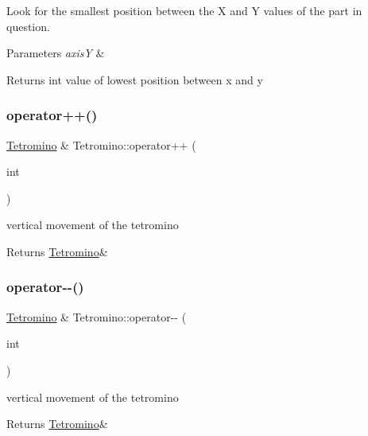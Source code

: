 Look for the smallest position between the X and Y values of the part in question. 


\begin{DoxyParams}{Parameters}
{\em axisY} & \\
\hline
\end{DoxyParams}
\begin{DoxyReturn}{Returns}
int value of lowest position between x and y 
\end{DoxyReturn}
\mbox{\label{classTetromino_ab4dd61078d1383df779f5f615d352a17}} 
\subsubsection{\texorpdfstring{operator++()}{operator++()}}
{\footnotesize\ttfamily \hyperlink{classTetromino}{Tetromino} \& Tetromino\+::operator++ (\begin{DoxyParamCaption}\item[{int}]{ }\end{DoxyParamCaption})}



vertical movement of the tetromino 

\begin{DoxyReturn}{Returns}
\hyperlink{classTetromino}{Tetromino}\& 
\end{DoxyReturn}
\mbox{\label{classTetromino_a3921b7fc54aca4d294b74b487d8c4183}} 
\subsubsection{\texorpdfstring{operator-\/-\/()}{operator--()}}
{\footnotesize\ttfamily \hyperlink{classTetromino}{Tetromino} \& Tetromino\+::operator-\/-\/ (\begin{DoxyParamCaption}\item[{int}]{ }\end{DoxyParamCaption})}



vertical movement of the tetromino 

\begin{DoxyReturn}{Returns}
\hyperlink{classTetromino}{Tetromino}\& 
\end{DoxyReturn}
\mbox{\label{classTetromino_aea3c0024088f53627d766fba6a3fb4e4}} 
